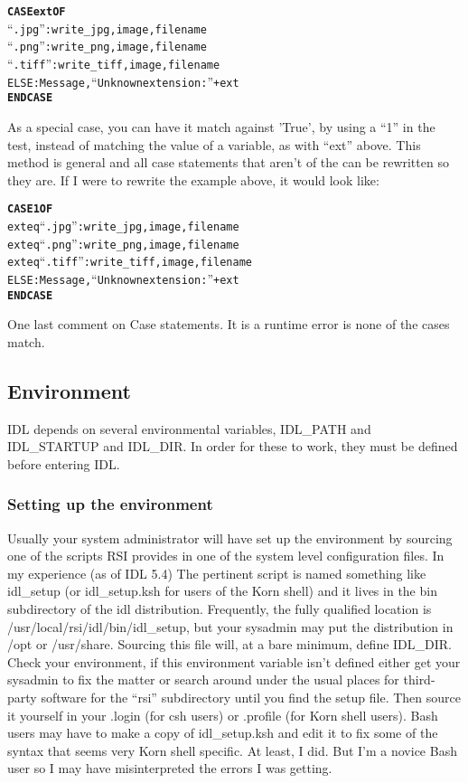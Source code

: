 \begin{alltt}
 \textbf{CASE ext OF}
  ``.jpg'': write_jpg, image, filename
  ``.png'': write_png, image, filename
  ``.tiff'': write_tiff, image, filename
  ELSE: Message, ``Unknown extension:'' + ext
 \textbf{ENDCASE}
\end{alltt}
       
        As a special case, you can have it match against 'True', by
        using a ``1'' in the test, instead of matching the value of a
        variable, as with ``ext'' above. This method is general
        and all case statements that aren't of the 
        can be rewritten so they are. If I were to rewrite the example
        above, it would look like:

\begin{alltt}
\textbf{CASE 1 OF}
  ext eq ``.jpg'': write_jpg, image, filename
  ext eq ``.png'': write_png, image, filename
  ext eq ``.tiff'': write_tiff, image, filename
  ELSE: Message, ``Unknown extension:'' + ext
\textbf{ENDCASE}
\end{alltt}

  One last comment on Case statements. It is a runtime error is none
  of the cases match.


\subsection{Environment}\label{sec:qs-environment}

     IDL depends on several environmental variables, IDL\_PATH and
     IDL\_STARTUP and IDL\_DIR. In order for these to work, they must
     be defined before entering IDL.


\subsubsection{Setting up the environment}\label{sec:qs-environment-setup}

  Usually your system administrator will have set up the environment
  by sourcing one of the scripts RSI provides in one of the system
  level configuration files. In my experience (as of IDL 5.4) The
  pertinent script is named something like idl\_setup (or
  idl\_setup.ksh for users of the Korn shell) and it lives in the bin
  subdirectory of the idl distribution. Frequently, the fully
  qualified location is /usr/local/rsi/idl/bin/idl\_setup, but your
  sysadmin may put the distribution in /opt or /usr/share. Sourcing
  this file will, at a bare minimum, define IDL\_DIR. Check your
  environment, if this environment variable isn't defined either get
  your sysadmin to fix the matter or search around under the usual
  places for third-party software for the ``rsi'' subdirectory until
  you find the setup file. Then source it yourself in your .login (for
  csh users) or .profile (for Korn shell users). Bash users may have
  to make a copy of idl\_setup.ksh and edit it to fix some of the
  syntax that seems very Korn shell specific. At least, I did. But I'm
  a novice Bash user so I may have misinterpreted the errors I was
  getting.

